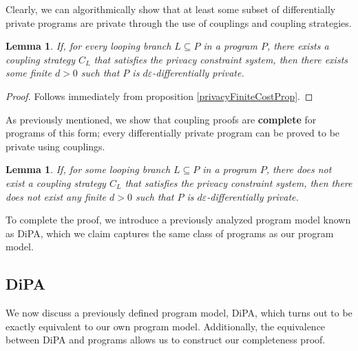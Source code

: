 \documentclass[12pt]{article}
\newtheorem{lemma}[thm]{Lemma}
\theoremstyle{definition}
\begin{document}
Clearly, we can algorithmically show that at least some subset of differentially private programs are private through the use of couplings and coupling strategies. 

\begin{lemma}
    If, for every looping branch $L\subseteq P$ in a program $P$, there exists a coupling strategy $C_L$ that satisfies the privacy constraint system, then there exists some finite $d>0$ such that $P$ is $d\varepsilon$-differentially private.    
\end{lemma}
\begin{proof}
    Follows immediately from proposition \ref{privacyFiniteCostProp}.
\end{proof}

As previously mentioned, we show that coupling proofs are \textbf{complete} for programs of this form; every differentially private program can be proved to be private using couplings. 

\begin{lemma}\label{ProgramCounterexampleLemma}
    If, for some looping branch $L\subseteq P$ in a program $P$, there does not exist a coupling strategy $C_L$ that satisfies the privacy constraint system, then there does not exist any finite $d>0$ such that $P$ is $d\varepsilon$-differentially private.
\end{lemma}

To complete the proof, we introduce a previously analyzed program model known as DiPA, which we claim captures the same class of programs as our program model. 

\subsection{DiPA}

We now discuss a previously defined program model, DiPA, which turns out to be exactly equivalent to our own program model. Additionally, the equivalence between DiPA and programs allows us to construct our completeness proof. 
\end{document}
